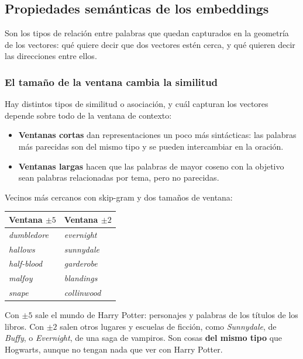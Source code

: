 \documentclass[11pt,letterpaper]{article}
\begin{document}

\subsection*{Propiedades semánticas de los embeddings}

Son los tipos de relación entre palabras que quedan capturados en la
geometría de los vectores: qué quiere decir que dos vectores estén
cerca, y qué quieren decir las direcciones entre ellos.

\subsubsection*{El tamaño de la ventana cambia la similitud}

Hay distintos tipos de similitud o asociación, y cuál capturan los
vectores depende sobre todo de la ventana de contexto:

\begin{itemize}[itemsep=0.3em]
    \item \textbf{Ventanas cortas} dan representaciones un poco más
          sintácticas: las palabras más parecidas son del mismo tipo y
          se pueden intercambiar en la oración.
    \item \textbf{Ventanas largas} hacen que las palabras de mayor
          coseno con la objetivo sean palabras relacionadas por tema,
          pero no parecidas.
\end{itemize}

\begin{ejemplo}
    Vecinos más cercanos con skip-gram y dos tamaños de ventana:
    \begin{center}
    \begin{tabular}{ll}
        \toprule
        \textbf{Ventana $\pm 5$} & \textbf{Ventana $\pm 2$} \\
        \midrule
        \textit{dumbledore} & \textit{evernight} \\
        \textit{hallows}    & \textit{sunnydale} \\
        \textit{half-blood} & \textit{garderobe} \\
        \textit{malfoy}     & \textit{blandings} \\
        \textit{snape}      & \textit{collinwood} \\
        \bottomrule
    \end{tabular}
    \end{center}
    Con $\pm 5$ sale el mundo de Harry Potter: personajes y palabras de
    los títulos de los libros. Con $\pm 2$ salen otros lugares y
    escuelas de ficción, como \textit{Sunnydale}, de \textit{Buffy}, o
    \textit{Evernight}, de una saga de vampiros. Son cosas
    \textbf{del mismo tipo} que Hogwarts, aunque no tengan nada que ver
    con Harry Potter.
\end{ejemplo}
\end{document}
